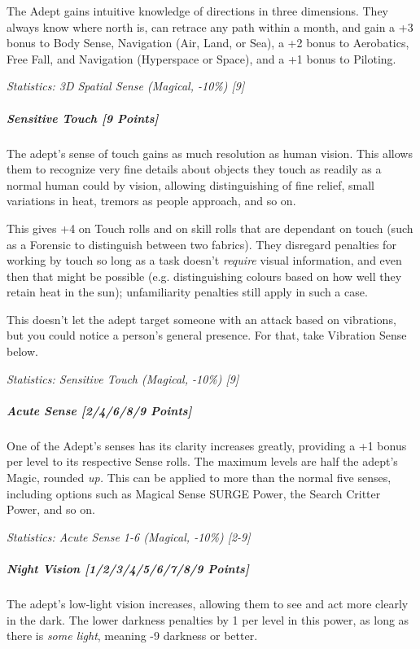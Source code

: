 \begin{multicols*}{3}
		The Adept gains intuitive knowledge of directions in three dimensions. They always know where north is, can retrace any path within a month, and gain a +3 bonus to Body Sense, Navigation (Air, Land, or Sea), a +2 bonus to Aerobatics, Free Fall, and Navigation (Hyperspace or Space), and a +1 bonus to Piloting.
		
		\textcolor{OliveGreen}{\textit{Statistics: 3D Spatial Sense (Magical, -10\%) [9]}}
			
	\subparagraph{Sensitive Touch [9 Points]}
	
		The adept's sense of touch gains as much resolution as human vision. This allows them to recognize very fine details about objects they touch as readily as a normal human could by vision, allowing distinguishing of fine relief, small variations in heat, tremors as people approach, and so on. 
		
		This gives +4 on Touch rolls and on skill rolls that are dependant on touch (such as a Forensic to distinguish between two fabrics). They disregard penalties for working by touch so long as a task doesn't \textit{require} visual information, and even then that might be possible (e.g. distinguishing colours based on how well they retain heat in the sun); unfamiliarity penalties still apply in such a case. 
		
		This doesn't let the adept target someone with an attack based on vibrations, but you could notice a person's general presence. For that, take Vibration Sense below.
			
		\textcolor{OliveGreen}{\textit{Statistics: Sensitive Touch (Magical, -10\%) [9] }}
			
	\subparagraph{Acute Sense [2/4/6/8/9 Points]}
	
		One of the Adept's senses has its clarity increases greatly, providing a +1 bonus per level to its respective Sense rolls. The maximum levels are half the adept's Magic, rounded \textit{up.} This can be applied to more than the normal five senses, including options such as Magical Sense SURGE Power, the Search Critter Power, and so on.
		
		\textcolor{OliveGreen}{\textit{Statistics: Acute Sense 1-6 (Magical, -10\%) [2-9]}}
				
	\subparagraph{Night Vision [1/2/3/4/5/6/7/8/9 Points]}
	
		The adept's low-light vision increases, allowing them to see and act more clearly in the dark. The lower darkness penalties by 1 per level in this power, as long as there is \textit{some light}, meaning -9 darkness or better.
		

\end{multicols*}
